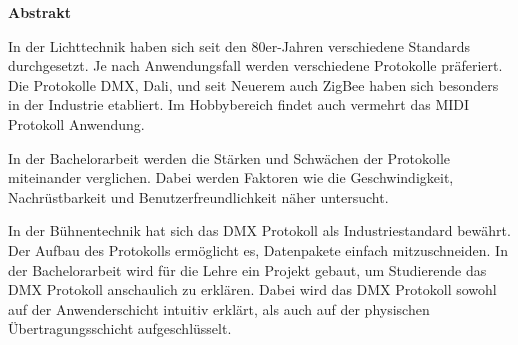 \thispagestyle{plain} %

{\huge\textbf{Abstrakt}}
\vspace{1cm}

In der Lichttechnik haben sich seit den 80er-Jahren verschiedene Standards durchgesetzt. Je nach Anwendungsfall werden verschiedene Protokolle präferiert. Die Protokolle DMX, Dali, und seit Neuerem auch ZigBee haben sich besonders in der Industrie etabliert. Im Hobbybereich findet auch vermehrt das MIDI Protokoll Anwendung.

In der Bachelorarbeit werden die Stärken und Schwächen der Protokolle miteinander verglichen. Dabei werden Faktoren wie die Geschwindigkeit, Nachrüstbarkeit und Benutzerfreundlichkeit näher untersucht.

In der Bühnentechnik hat sich das DMX Protokoll als Industriestandard bewährt. Der Aufbau des Protokolls ermöglicht es, Datenpakete einfach mitzuschneiden. In der Bachelorarbeit wird für die Lehre ein Projekt gebaut, um Studierende das DMX Protokoll anschaulich zu erklären. Dabei wird das DMX Protokoll sowohl auf der Anwenderschicht intuitiv erklärt, als auch auf der physischen Übertragungsschicht aufgeschlüsselt.